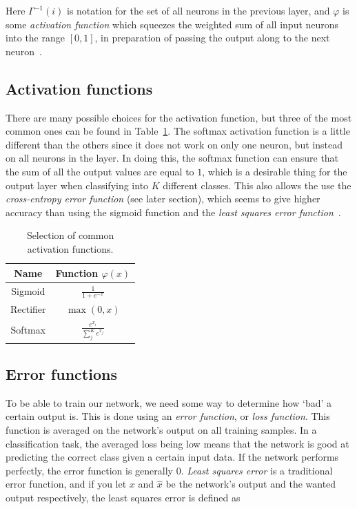 \documentclass{kththesis}
\renewcommand{\arraystretch}{1.2}
\begin{document}
Here $\Gamma^{-1}(i)$ is notation for the set of all neurons in the previous layer, and $\varphi$ is some \textit{activation function} which squeezes the weighted sum of all input neurons into the range $[0, 1]$, in preparation of passing the output along to the next neuron~\cite{mlfIntro}.

\subsection{Activation functions}
There are many possible choices for the activation function, but three of the most common ones can be found in Table~\ref{tab:activation_functions}. The softmax activation function is a little different than the others since it does not work on only one neuron, but instead on all neurons in the layer. In doing this, the softmax function can ensure that the sum of all the output values are equal to $1$, which is a desirable thing for the output layer when classifying into $K$ different classes. This also allows the use the \textit{cross-entropy error function} (see later section), which seems to give higher accuracy than using the sigmoid function and the \textit{least squares error function}~\cite{dunne1997pairing}.

\begin{table}[h]
  \renewcommand{\arraystretch}{1.2}
  \begin{center}
    \caption{Selection of common activation functions.}
    \label{tab:activation_functions}
    \begin{tabular}{cc}
      \textbf{Name} & \textbf{Function} $\varphi(x)$\\
      \toprule
      Sigmoid & $\displaystyle \frac{1}{1 + e^{-x}} $ \\[4mm]
      Rectifier & $\displaystyle \max(0, x)$ \\[3mm]
      Softmax & $\displaystyle \frac{e^{x_i}}{\sum_j^K{e^{x_j}}}$ \\
    \end{tabular}
  \end{center}
\end{table}

\subsection{Error functions}
To be able to train our network, we need some way to determine how `bad' a certain output is. This is done using an \textit{error function}, or \textit{loss function}. This function is averaged on the network's output on all training samples. In a classification task, the averaged loss being low means that the network is good at predicting the correct class given a certain input data. If the network performs perfectly, the error function is generally $0$. \textit{Least squares error} is a traditional error function, and if you let $x$ and $\hat{x}$ be the network's output and the wanted output respectively, the least squares error is defined as~\cite{mlfIntro}
\end{document}
